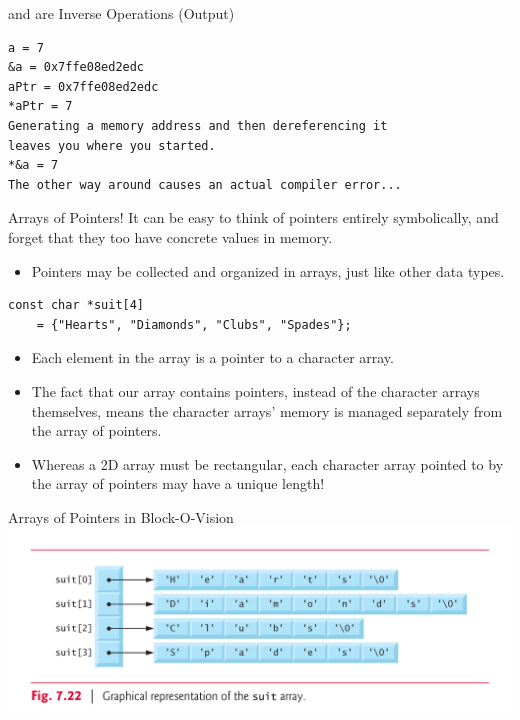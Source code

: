 \documentclass[11pt]{beamer}
\let\OldTexttt\texttt
\renewcommand{\texttt}[1]{\OldTexttt{\color{teal}{#1}}}
\begin{document}
\begin{frame}[fragile=singleslide]{\texttt{\&} and \texttt{*} are Inverse Operations (Output)}
\begin{verbatim}
a = 7
&a = 0x7ffe08ed2edc
aPtr = 0x7ffe08ed2edc
*aPtr = 7
Generating a memory address and then dereferencing it
leaves you where you started.
*&a = 7
The other way around causes an actual compiler error...
\end{verbatim}
\end{frame}

\begin{frame}[fragile=singleslide]{Arrays of Pointers!}
It can be easy to think of pointers entirely symbolically, and forget that they too have concrete values in memory.
\begin{itemize}
\item Pointers may be collected and organized in arrays, just like other data types.  
\end{itemize}
\begin{lstlisting}[style=C]
const char *suit[4] 
    = {"Hearts", "Diamonds", "Clubs", "Spades"};
\end{lstlisting}
\begin{itemize}
\item Each element in the array is a pointer to a character array.
\item The fact that our array contains pointers, instead of the character arrays themselves, means the character arrays' memory is managed separately from the array of pointers.
\item Whereas a 2D array must be rectangular, each character array pointed to by the array of pointers may have a unique length! 
\end{itemize}
\end{frame}

\begin{frame}{Arrays of Pointers in Block-O-Vision}
\center
\includegraphics[scale=0.1]{tbf.png}
\end{frame}
\end{document}
